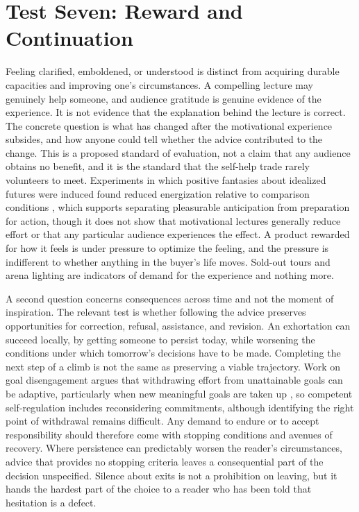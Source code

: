 \documentclass[12pt]{article}
\begin{document}
\section{Test Seven: Reward and Continuation}\label{sec:t7}

Feeling clarified, emboldened, or understood is distinct from acquiring durable capacities and improving one's circumstances. A compelling lecture may genuinely help someone, and audience gratitude is genuine evidence of the experience. It is not evidence that the explanation behind the lecture is correct. The concrete question is what has changed after the motivational experience subsides, and how anyone could tell whether the advice contributed to the change. This is a proposed standard of evaluation, not a claim that any audience obtains no benefit, and it is the standard that the self-help trade rarely volunteers to meet. Experiments in which positive fantasies about idealized futures were induced found reduced energization relative to comparison conditions \cite{kappes2011}, which supports separating pleasurable anticipation from preparation for action, though it does not show that motivational lectures generally reduce effort or that any particular audience experiences the effect. A product rewarded for how it feels is under pressure to optimize the feeling, and the pressure is indifferent to whether anything in the buyer's life moves. Sold-out tours and arena lighting are indicators of demand for the experience and nothing more.

A second question concerns consequences across time and not the moment of inspiration. The relevant test is whether following the advice preserves opportunities for correction, refusal, assistance, and revision. An exhortation can succeed locally, by getting someone to persist today, while worsening the conditions under which tomorrow's decisions have to be made. Completing the next step of a climb is not the same as preserving a viable trajectory. Work on goal disengagement argues that withdrawing effort from unattainable goals can be adaptive, particularly when new meaningful goals are taken up \cite{wrosch2003}, so competent self-regulation includes reconsidering commitments, although identifying the right point of withdrawal remains difficult. Any demand to endure or to accept responsibility should therefore come with stopping conditions and avenues of recovery. Where persistence can predictably worsen the reader's circumstances, advice that provides no stopping criteria leaves a consequential part of the decision unspecified. Silence about exits is not a prohibition on leaving, but it hands the hardest part of the choice to a reader who has been told that hesitation is a defect.
\end{document}
